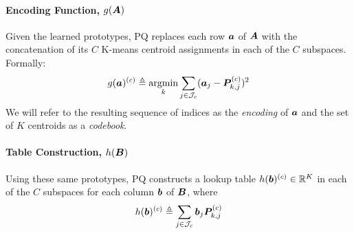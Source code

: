 
\vspace{-2mm}
\paragraph{Encoding Function, $g(\bm{A})$}

Given the learned prototypes, PQ replaces each row $\bm{a}$ of $\bm{A}$ with the concatenation of its $C$ K-means centroid assignments in each of the $C$ subspaces. Formally:
\vspace{-.5mm}
\begin{align} \label{eq:pqLoss}
    g(\bm{a})^{(c)} \triangleq \operatorname*{argmin}_k \sum_{j\in \mathcal{J}_c} (\bm{a}_j - \bm{P}^{(c)}_{k,j})^2
\end{align}
\vspace{-.5mm}
We will refer to the resulting sequence of indices as the \textit{encoding} of $\bm{a}$ and the set of $K$ centroids as a \textit{codebook}. %

\vspace{-2mm}
\paragraph{Table Construction, $h(\bm{B})$}

Using these same prototypes, PQ constructs a lookup table $h(\bm{b})^{(c)} \in \mathbb{R}^K$ in each of the $C$ subspaces for each column $\bm{b}$ of $\bm{B}$, where
\begin{align}
    h(\bm{b})^{(c)} \triangleq \sum_{j\in \mathcal{J}_c} \bm{b}_j \bm{P}^{(c)}_{k,j}
\end{align}

